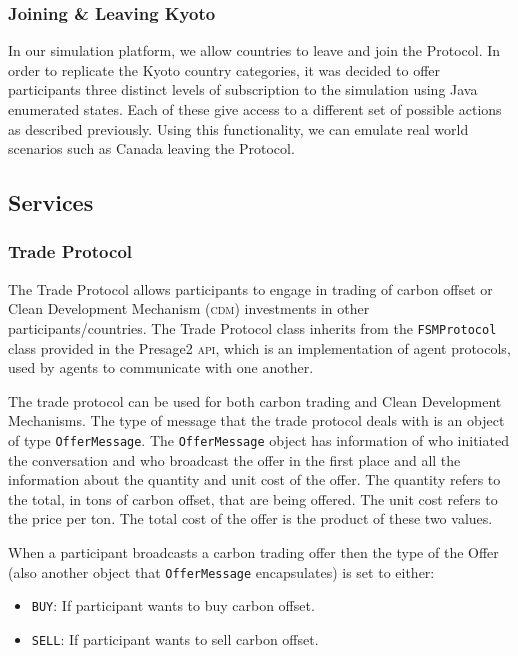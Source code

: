 \subsubsection{Joining \& Leaving Kyoto}

In our simulation platform, we allow countries to leave and join the Protocol. In order to replicate the Kyoto country categories, it was decided to offer participants three distinct levels of subscription to the simulation using Java enumerated states. Each of these give access to a different set of possible actions as described previously. Using this functionality, we can emulate real world scenarios such as Canada leaving the Protocol.

\subsection{Services}

\subsubsection{Trade Protocol}

The Trade Protocol allows participants to engage in trading of carbon offset or Clean Development Mechanism (\textsc{cdm}) investments in other participants/countries. The Trade Protocol class inherits from the \texttt{FSMProtocol} class provided in the Presage2 \textsc{api}, which is an implementation of agent protocols, used by agents to communicate with one another.
 
The trade protocol can be used for both carbon trading and Clean Development Mechanisms. The type of message that the trade protocol deals with is an object of type \texttt{OfferMessage}. The \texttt{OfferMessage} object has information of who initiated the conversation and who broadcast the offer in the first place and all the information about the quantity and unit cost of the offer. The quantity refers to the total, in tons of carbon offset, that are being offered. The unit cost refers to the price per ton. The total cost of the offer is the product of these two values.

When a participant broadcasts a carbon trading offer then the type of the Offer (also another 
object that \texttt{OfferMessage} encapsulates) is set to either:
 
\begin{itemize}
	\item \texttt{BUY}: If participant wants to buy carbon offset.
	\item \texttt{SELL}: If participant wants to sell carbon offset.
\end{itemize}

